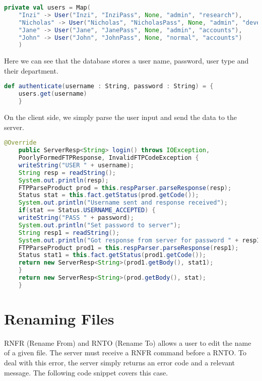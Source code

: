 \begin{lstlisting}[language=Scala, caption=Database of users, tabsize=2]
	private val users = Map(
	"Inzi" -> User("Inzi", "InziPass", None, "admin", "research"),
	"Nicholas" -> User("Nicholas", "NicholasPass", None, "admin", "development"),
	"Jane" -> User("Jane", "JanePass", None, "admin", "accounts"),
	"John" -> User("John", "JohnPass", None, "normal", "accounts")
	)

\end{lstlisting}

Here we can see that the database stores a user name, password, user type and their department.

\begin{lstlisting}[language=Scala, caption=Authentication, tabsize=2]
	def authenticate(username : String, password : String) = {
	users.get(username)
	}

\end{lstlisting}

\newpage
On the client side, we simply parse the user input and send the data to the server.
\begin{lstlisting}[language=Java, caption=Send authentication data to the server, showstringspaces=false, tabsize=2]
	@Override
	public ServerResp<String> login() throws IOException,
	PoorlyFormedFTPResponse, InvalidFTPCodeException {
	writeString("USER " + username);
	String resp = readString();
	System.out.println(resp);
	FTPParseProduct prod = this.respParser.parseResponse(resp);
	Status stat = this.fact.getStatus(prod.getCode());
	System.out.println("Username sent and response received");
	if(stat == Status.USERNAME_ACCEPTED) {
	writeString("PASS " + password);
	System.out.println("Set password to server");
	String resp1 = readString();
	System.out.println("Got response from server for password " + resp1);
	FTPParseProduct prod1 = this.respParser.parseResponse(resp1);
	Status stat1 = this.fact.getStatus(prod1.getCode());
	return new ServerResp<String>(prod1.getBody(), stat1);
	}
	return new ServerResp<String>(prod.getBody(), stat);
	}
\end{lstlisting}
\newpage
\section{Renaming Files}

RNFR (Rename From) and RNTO (Rename To) allows a user to edit the name of a given file.
The server must receive a RNFR command before a RNTO. To deal with this error, the server
simply returns an error code and a relevant message. The following code snippet covers this case.

